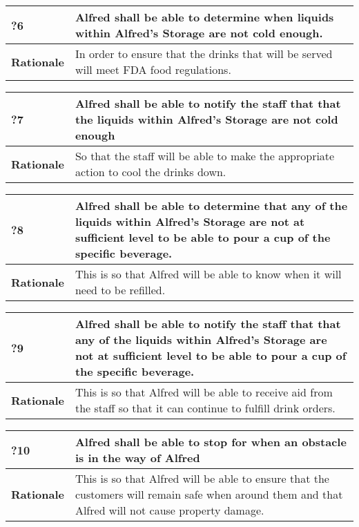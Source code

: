 \documentclass [11pt]{article}
\begin{document}
\begin{longtable}{| p{ } | p{ } | }\hline 
	\rowcolor{tableCell}\textbf{?6} & Alfred shall be able to determine when liquids within Alfred's Storage are not cold enough.\\ \hline
	\textbf{Rationale} &  In order to ensure that the drinks that will be served will meet FDA food regulations. \\ \hline 
\end{longtable}

\begin{longtable}{| p{ } | p{ } | }\hline 
	\rowcolor{tableCell}\textbf{?7} & Alfred shall be able to notify the staff that that the liquids within Alfred's Storage are not cold enough\\ \hline
	\textbf{Rationale} &  So that the staff will be able to make the appropriate action to cool the drinks down.\\ \hline 
\end{longtable}

\begin{longtable}{| p{ } | p{ } | }\hline 
	\rowcolor{tableCell}\textbf{?8} & Alfred shall be able to determine that any of the liquids within Alfred's Storage are not at sufficient level to be able to pour a cup of the specific beverage. \\ \hline
	\textbf{Rationale} &  This is so that Alfred will be able to know when it will need to be refilled.\\ \hline 
\end{longtable}

\begin{longtable}{| p{ } | p{ } | }\hline 
	\rowcolor{tableCell}\textbf{?9} & Alfred shall be able to notify the staff that that any of the liquids within Alfred's Storage are not at sufficient level to be able to pour a cup of the specific beverage. \\ \hline
	\textbf{Rationale} &  This is so that Alfred will be able to receive aid from the staff so that it can continue to fulfill drink orders.\\ \hline 
\end{longtable}

\begin{longtable}{| p{ } | p{ } | }\hline 
	\rowcolor{tableCell}\textbf{?10} & Alfred shall be able to stop for when an obstacle is in the way of Alfred \\ \hline
	\textbf{Rationale} &  This is so that Alfred will be able to ensure that the customers will remain safe when around them and that Alfred will not cause property damage.\\ \hline 
\end{longtable}
\end{document}
